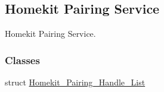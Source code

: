 \hypertarget{group___h_p_s}{}\subsection{Homekit Pairing Service}
\label{group___h_p_s}


Homekit Pairing Service.  


\subsubsection*{Classes}
\begin{DoxyCompactItemize}
\item 
struct \hyperlink{struct_homekit___pairing___handle___list}{Homekit\+\_\+\+Pairing\+\_\+\+Handle\+\_\+\+List}
\end{DoxyCompactItemize}
